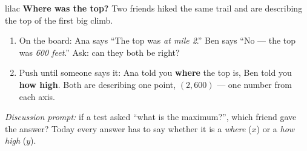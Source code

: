 \documentclass[10pt]{article}
\begin{document}
\begin{skillbox}{lilac}
    \textbf{Where was the top?} Two friends hiked the same trail and are describing the top of
    the first big climb.
    \begin{enumerate}[itemsep=2pt]
        \item On the board: Ana says ``The top was \textit{at mile 2}.'' Ben says ``No --- the
              top was \textit{600 feet}.'' Ask: can they both be right?
        \item Push until someone says it: Ana told you \textbf{where} the top is, Ben told you
              \textbf{how high}. Both are describing one point, $(2, 600)$ --- one number from
              each axis.
    \end{enumerate}
    \textit{Discussion prompt:} if a test asked ``what is the maximum?'', which friend gave the
    answer? Today every answer has to say whether it is a \textit{where} ($x$) or a
    \textit{how high} ($y$).
\end{skillbox}
\end{document}
